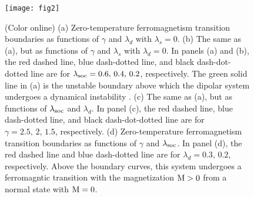 \documentclass[twocolumn,english,pra,superscriptaddress]{revtex4-1}
\begin{document}
\begin{figure}[t!]
	\texttt{[image: fig2]}%
	\caption{(Color online) (a) Zero-temperature ferromagnetism transition boundaries as functions of $\gamma$ and $\lambda_{d}$ with $\lambda_{s}=0$. (b) The same as (a), but as functions of $\gamma$ and $\lambda_{s}$ with $\lambda_{d}=0$. In panels (a) and (b), the red dashed line, blue dash-dotted line, and black dash-dot-dotted line are for $\lambda_{\rm soc}=0.6,\,0.4,\,0.2$, respectively. The green solid line in (a) is the unstable boundary above which the dipolar system undergoes a dynamical instability \cite{PhysRevLett.103.205301}. (c) The same as (a), but as functions of $\lambda_{\rm soc}$ and $\lambda_{d}$. In panel (c), the red dashed line, blue dash-dotted line, and black dash-dot-dotted line are for $\gamma=2.5,\,2,\,1.5$, respectively. (d) Zero-temperature ferromagnetism transition boundaries as functions of $\gamma$ and $\lambda_{\rm soc}$. In panel (d), the red dashed line and blue dash-dotted line are for $\lambda_{d}=0.3,\,0.2$, respectively. Above the boundary curves, this system undergoes a ferromagntic transition with the magnetization $\rm M>0$ from a normal state with $\rm M=0$. 
	}\label{fig2}
\end{figure}
\end{document}
